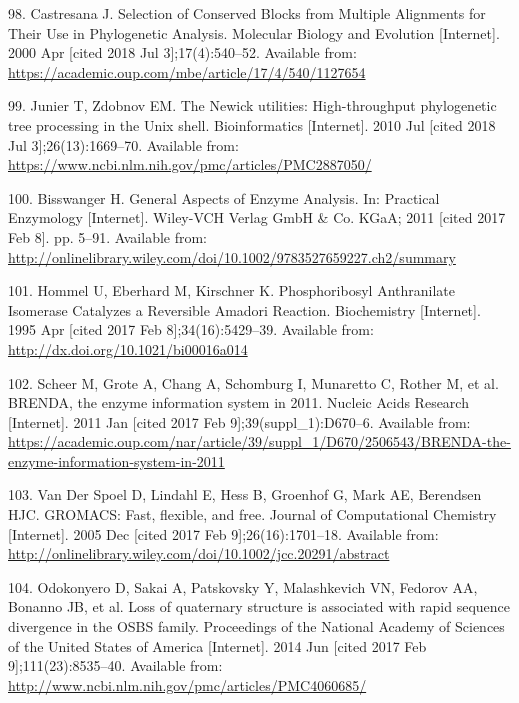 \documentclass[12pt,twoside]{reedthesis}
\begin{document}
  \hypertarget{ref-castresana_selection_2000}{}
  98. Castresana J. Selection of Conserved Blocks from Multiple Alignments
  for Their Use in Phylogenetic Analysis. Molecular Biology and Evolution
  {[}Internet{]}. 2000 Apr {[}cited 2018 Jul 3{]};17(4):540--52. Available
  from: \url{https://academic.oup.com/mbe/article/17/4/540/1127654}
  
  \hypertarget{ref-junier_newick_2010}{}
  99. Junier T, Zdobnov EM. The Newick utilities: High-throughput
  phylogenetic tree processing in the Unix shell. Bioinformatics
  {[}Internet{]}. 2010 Jul {[}cited 2018 Jul 3{]};26(13):1669--70.
  Available from:
  \url{https://www.ncbi.nlm.nih.gov/pmc/articles/PMC2887050/}
  
  \hypertarget{ref-bisswanger_general_2011}{}
  100. Bisswanger H. General Aspects of Enzyme Analysis. In: Practical
  Enzymology {[}Internet{]}. Wiley-VCH Verlag GmbH \& Co. KGaA; 2011
  {[}cited 2017 Feb 8{]}. pp. 5--91. Available from:
  \url{http://onlinelibrary.wiley.com/doi/10.1002/9783527659227.ch2/summary}
  
  \hypertarget{ref-hommel_phosphoribosyl_1995}{}
  101. Hommel U, Eberhard M, Kirschner K. Phosphoribosyl Anthranilate
  Isomerase Catalyzes a Reversible Amadori Reaction. Biochemistry
  {[}Internet{]}. 1995 Apr {[}cited 2017 Feb 8{]};34(16):5429--39.
  Available from: \url{http://dx.doi.org/10.1021/bi00016a014}
  
  \hypertarget{ref-scheer_brenda_2011}{}
  102. Scheer M, Grote A, Chang A, Schomburg I, Munaretto C, Rother M, et
  al. BRENDA, the enzyme information system in 2011. Nucleic Acids
  Research {[}Internet{]}. 2011 Jan {[}cited 2017 Feb
  9{]};39(suppl\_1):D670--6. Available from:
  \url{https://academic.oup.com/nar/article/39/suppl_1/D670/2506543/BRENDA-the-enzyme-information-system-in-2011}
  
  \hypertarget{ref-van_der_spoel_gromacs_2005}{}
  103. Van Der Spoel D, Lindahl E, Hess B, Groenhof G, Mark AE, Berendsen
  HJC. GROMACS: Fast, flexible, and free. Journal of Computational
  Chemistry {[}Internet{]}. 2005 Dec {[}cited 2017 Feb
  9{]};26(16):1701--18. Available from:
  \url{http://onlinelibrary.wiley.com/doi/10.1002/jcc.20291/abstract}
  
  \hypertarget{ref-odokonyero_loss_2014}{}
  104. Odokonyero D, Sakai A, Patskovsky Y, Malashkevich VN, Fedorov AA,
  Bonanno JB, et al. Loss of quaternary structure is associated with rapid
  sequence divergence in the OSBS family. Proceedings of the National
  Academy of Sciences of the United States of America {[}Internet{]}. 2014
  Jun {[}cited 2017 Feb 9{]};111(23):8535--40. Available from:
  \url{http://www.ncbi.nlm.nih.gov/pmc/articles/PMC4060685/}
  
\end{document}
